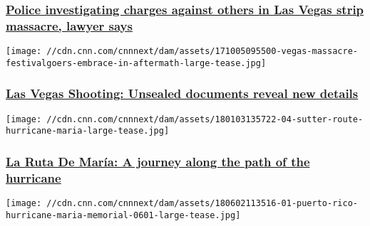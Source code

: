 \hypertarget{police-investigating-charges-against-others-in-las-vegas-strip-massacre-lawyer-says-}{%
\subsubsection{\texorpdfstring{\href{/2018/01/16/us/las-vegas-shooting-court-hearing/index.html}{Police
investigating charges against others in Las Vegas strip massacre, lawyer
says
}}{Police investigating charges against others in Las Vegas strip massacre, lawyer says }}\label{police-investigating-charges-against-others-in-las-vegas-strip-massacre-lawyer-says-}}

\href{/2018/01/12/us/las-vegas-shooting-documents-unsealed/index.html}{}

\texttt{[image: //cdn.cnn.com/cnnnext/dam/assets/171005095500-vegas-massacre-festivalgoers-embrace-in-aftermath-large-tease.jpg]}

\hypertarget{las-vegas-shooting-unsealed-documents-reveal-new-details}{%
\subsubsection{\texorpdfstring{\href{/2018/01/12/us/las-vegas-shooting-documents-unsealed/index.html}{Las
Vegas Shooting: Unsealed documents reveal new
details}}{Las Vegas Shooting: Unsealed documents reveal new details}}\label{las-vegas-shooting-unsealed-documents-reveal-new-details}}

\href{/2018/01/12/us/sutter-maria-route-puerto-rico-invs/index.html}{}

\texttt{[image: //cdn.cnn.com/cnnnext/dam/assets/180103135722-04-sutter-route-hurricane-maria-large-tease.jpg]}

\hypertarget{la-ruta-de-maruxeda-a-journey-along-the-path-of-the-hurricane}{%
\subsubsection{\texorpdfstring{\href{/2018/01/12/us/sutter-maria-route-puerto-rico-invs/index.html}{La
Ruta De María: A journey along the path of the
hurricane}}{La Ruta De María: A journey along the path of the hurricane}}\label{la-ruta-de-maruxeda-a-journey-along-the-path-of-the-hurricane}}

\href{/2018/06/05/us/puerto-rico-hurricane-maria-death-records/index.html}{}

\texttt{[image: //cdn.cnn.com/cnnnext/dam/assets/180602113516-01-puerto-rico-hurricane-maria-memorial-0601-large-tease.jpg]}

